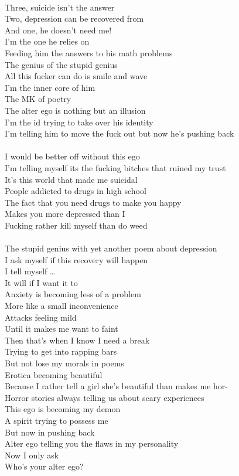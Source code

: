 \documentclass[12pt, b5paper, oneside]{book}
\begin{document}
\\Three, suicide isn't the answer
\\Two, depression can be recovered from
\\And one, he doesn't need me!
\\I'm the one he relies on
\\Feeding him the answers to his math problems
\\The genius of the stupid genius
\\All this fucker can do is smile and wave
\\I'm the inner core of him
\\The MK of poetry
\\The alter ego is nothing but an illusion
\\I'm the id trying to take over his identity
\\I'm telling him to move the fuck out but now he's pushing back
%
\\\\I would be better off without this ego
\\I'm telling myself its the fucking bitches that ruined my trust
\\It's this world that made me suicidal
\\People addicted to drugs in high school
\\The fact that you need drugs to make you happy
\\Makes you more depressed than I
\\Fucking rather kill myself than do weed
%
\\\\The stupid genius with yet another poem about depression
\\I ask myself if this recovery will happen
\\I tell myself \dots 
\\It will if I want it to
\\Anxiety is becoming less of a problem 
\\More like a small inconvenience
\\Attacks feeling mild
\\Until it makes me want to faint
\\Then that's when I know I need a break
\\Trying to get into rapping bars
\\But not lose my morals in poems
\\Erotica becoming beautiful
\\Because I rather tell a girl she's beautiful than makes me hor-
%
\\Horror stories always telling us about scary experiences
\\This ego is becoming my demon
\\A spirit trying to possess me
\\But now in pushing back
\\Alter ego telling you the flaws in my personality
\\Now I only ask
\\Who's your alter ego? 
\newpage
\end{document}
